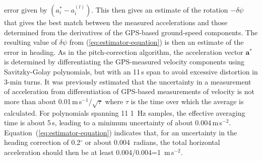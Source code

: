 \documentclass[12pt,twoside,english,12pt,twoside,english]{article}\usepackage[]{graphicx}\usepackage[]{color}
\let\OrgIndex\index
\renewcommand*{\index}[1]{\OrgIndex{#1}}
\begin{document}
error given by $(a_{i}^{*}-a_{i}^{(l)})$. This then gives an estimate
of the rotation $-\delta\psi$ that gives the best match between the
measured accelerations  and those
determined from the derivatives
of the GPS-based ground-speed
components. The resulting value of $\delta\psi$ from (\ref{eq:estimator-equation})
is then an estimate of the error in
heading. As in the pitch-correction algorithm, the acceleration
vector $\mathbf{a^{*}}$ is determined by differentiating the GPS-measured
velocity components using Savitzky-Golay polynomials, 
but with an 11\,s span to avoid excessive distortion in 3-min turns.
It was previously estimated that the uncertainty
in a measurement of acceleration from differentiation of GPS-based
measurements of velocity is not more than about 0.01\,m\,s$^{-1}$/$\sqrt{\tau}$
where $\tau$
is the time over which the average is calculated. For polynomials
spanning 11 1~Hz samples, the effective averaging time is about 5\,s,
leading to a minimum uncertainty of about 0.004\,m\,s$^{-2}$. Equation~(\ref{eq:estimator-equation})
indicates that, for an uncertainty in
the heading correction of 0.2$^{\circ}$ or about 0.004~radians,
the total horizontal acceleration should then be at least 0.004/0.004=1~m\,s$^{-2}$.
\end{document}
